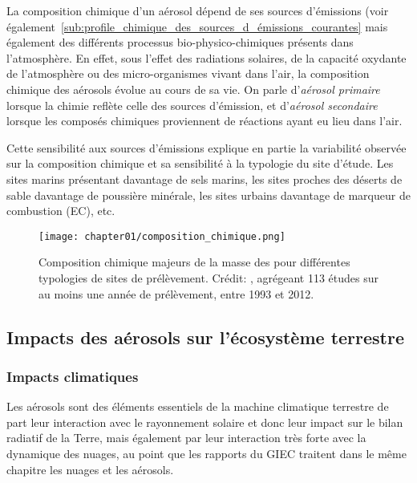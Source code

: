 La composition chimique d'un aérosol dépend de ses sources d'émissions (voir
également~\ref{sub:profile_chimique_des_sources_d_émissions_courantes} mais également des
différents processus bio-physico-chimiques présents dans l'atmosphère. En effet, sous
l'effet des radiations solaires, de la capacité oxydante de l'atmosphère ou des
micro-organismes vivant dans l'air, la composition chimique des aérosols évolue au cours
de sa vie. On parle d'\textit{aérosol primaire} lorsque la chimie reflète celle des
sources d'émission, et d'\textit{aérosol secondaire} lorsque les composés chimiques
proviennent de réactions ayant eu lieu dans l'air.

Cette sensibilité aux sources d'émissions explique en partie la variabilité observée sur
la composition chimique et sa sensibilité à la typologie du site d'étude. Les sites
marins présentant davantage de sels marins, les sites proches des déserts de sable
davantage de poussière minérale, les sites urbains davantage de marqueur de combustion
(EC), etc.

\begin{figure}[htpb]
    \centering
    \texttt{[image: chapter01/composition\_chimique.png]}
    \caption{Composition chimique majeurs de la masse des \PMdix{} pour différentes
        typologies de sites de prélèvement. Crédit: \cite[figure 7.13]{boucherClouds2013},
        agrégeant 113 études sur au moins une année de prélèvement, entre 1993 et 2012.}%
    \label{fig:chapter01/composition_chimique}
\end{figure}

\subsection{Impacts des aérosols sur l'écosystème terrestre}%
\label{sub:impacts_des_aérosols_sur_l_écosystème_terrestre}

\subsubsection{Impacts climatiques}%
\label{ssub:impacts_climatiques}

Les aérosols sont des éléments essentiels de la machine climatique terrestre de part leur
interaction avec le rayonnement solaire et donc leur impact sur le bilan radiatif de la
Terre, mais également par leur interaction très forte avec la dynamique des nuages, au
point que les rapports du GIEC traitent dans le même chapitre les nuages et les aérosols.

